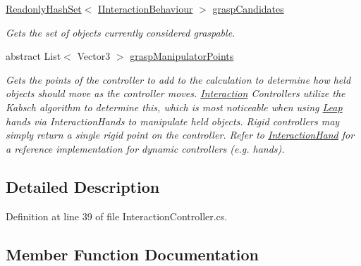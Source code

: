 \begin{DoxyCompactItemize}
\mbox{\hyperlink{struct_leap_1_1_unity_1_1_readonly_hash_set}{Readonly\+Hash\+Set}}$<$ \mbox{\hyperlink{interface_leap_1_1_unity_1_1_interaction_1_1_i_interaction_behaviour}{I\+Interaction\+Behaviour}} $>$ \mbox{\hyperlink{class_leap_1_1_unity_1_1_interaction_1_1_interaction_controller_a7b07298222ede0d272988129488ef445}{grasp\+Candidates}}
\begin{DoxyCompactList}\small\item\em Gets the set of objects currently considered graspable. \end{DoxyCompactList}\item 
abstract List$<$ Vector3 $>$ \mbox{\hyperlink{class_leap_1_1_unity_1_1_interaction_1_1_interaction_controller_a6f7f56adcad9f72d65f02e7490403df2}{grasp\+Manipulator\+Points}}
\begin{DoxyCompactList}\small\item\em Gets the points of the controller to add to the calculation to determine how held objects should move as the controller moves. \mbox{\hyperlink{namespace_leap_1_1_unity_1_1_interaction}{Interaction}} Controllers utilize the Kabsch algorithm to determine this, which is most noticeable when using \mbox{\hyperlink{namespace_leap_1_1_unity_1_1_leap}{Leap}} hands via Interaction\+Hands to manipulate held objects. Rigid controllers may simply return a single rigid point on the controller. Refer to \mbox{\hyperlink{class_leap_1_1_unity_1_1_interaction_1_1_interaction_hand}{Interaction\+Hand}} for a reference implementation for dynamic controllers (e.\+g. hands). \end{DoxyCompactList}\end{DoxyCompactItemize}


\subsection{Detailed Description}


Definition at line 39 of file Interaction\+Controller.\+cs.



\subsection{Member Function Documentation}
\mbox{\label{class_leap_1_1_unity_1_1_interaction_1_1_interaction_controller_a672d3a9313dbe37a693702024a61657d}} 
